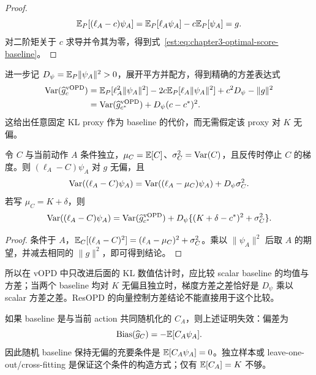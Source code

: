 \begin{proof}
\begin{equation*}
 \mathbb E_P[(\ell_A-c)\psi_A]=\mathbb E_P[\ell_A\psi_A]-c\mathbb E_P[\psi_A]=g.
\end{equation*}
对二阶矩关于 $c$ 求导并令其为零，得到式~\eqref{est:eq:chapter3-optimal-score-baseline}。
\end{proof}

进一步记 $D_\psi=\mathbb E_P\lVert \psi_A\rVert^2>0$，展开平方并配方，得到精确的方差表达式
\begin{align*}
 \operatorname{Var}(\widehat g_c^{\mathrm{vOPD}})
 &=\mathbb E_P[\ell_A^2\lVert \psi_A\rVert^2]
   -2c\mathbb E_P[\ell_A\lVert \psi_A\rVert^2]+c^2D_\psi-\lVert g\rVert^2\\
 &=\operatorname{Var}(\widehat g_{c^*}^{\mathrm{vOPD}})+D_\psi(c-c^*)^2.
\end{align*}
这给出任意固定 KL proxy 作为 baseline 的代价，而无需假定该 proxy 对 $K$ 无偏。

\begin{proposition}
令 $C$ 与当前动作 $A$ 条件独立，$\mu_C=\mathbb E[C]$、$\sigma_C^2=\operatorname{Var}(C)$，且反传时停止 $C$ 的梯度。则 $(\ell_A-C)\psi_A$ 对 $g$ 无偏，且
\begin{equation*}
 \operatorname{Var}((\ell_A-C)\psi_A)
 =\operatorname{Var}((\ell_A-\mu_C)\psi_A)+D_\psi\sigma_C^2.
\end{equation*}
若写 $\mu_C=K+\delta$，则
\begin{equation*}
 \operatorname{Var}((\ell_A-C)\psi_A)
 =\operatorname{Var}(\widehat g_{c^*}^{\mathrm{vOPD}})
  +D_\psi\{(K+\delta-c^*)^2+\sigma_C^2\}.
\end{equation*}
\end{proposition}

\begin{proof}
条件于 $A$，$\mathbb E_C[(\ell_A-C)^2]=(\ell_A-\mu_C)^2+\sigma_C^2$。乘以 $\lVert \psi_A\rVert^2$ 后取 $A$ 的期望，并减去相同的 $\lVert g\rVert^2$，即可得到结论。
\end{proof}

所以在 vOPD 中只改进后面的 KL 数值估计时，应比较 scalar baseline 的均值与方差；当两个 baseline 均对 $K$ 无偏且独立时，梯度方差之差恰好是 $D_\psi$ 乘以 scalar 方差之差。ResOPD 的向量控制方差结论不能直接用于这个比较。

如果 baseline 是与当前 action 共同随机化的 $C_A$，则上述证明失效：偏差为
\begin{equation}
 \operatorname{Bias}(\widehat g_C)=-\mathbb E[C_A\psi_A].
 \label{est:eq:chapter3-random-baseline-bias}
\end{equation}
因此随机 baseline 保持无偏的充要条件是 $\mathbb E[C_A\psi_A]=0$。独立样本或 leave-one-out/cross-fitting 是保证这个条件的构造方式；仅有 $\mathbb E[C_A]=K$ 不够。

